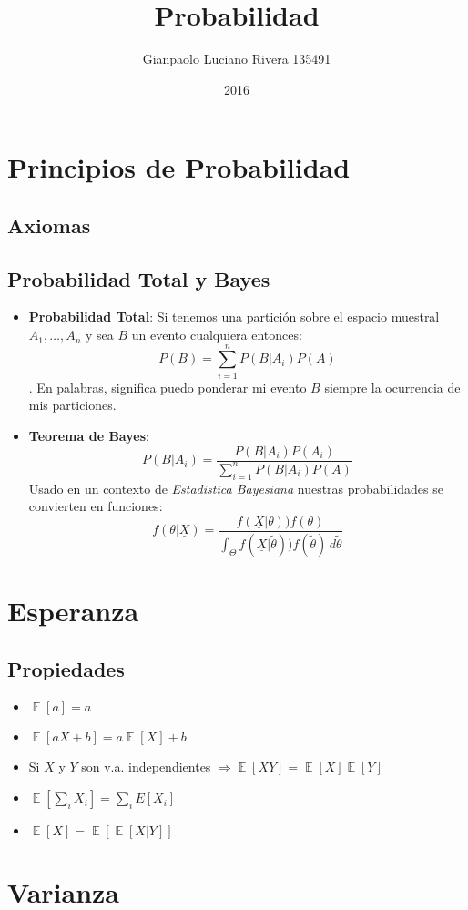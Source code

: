 \documentclass[pdftex,11pt,a4paper]{article}
\title{Probabilidad}
\author{Gianpaolo Luciano Rivera 135491}
\date{2016}
\DeclareMathOperator{\E}{\mathbb{E}}
\begin{document}
\maketitle

\section{Principios de Probabilidad}
\subsection{Axiomas}
\subsection{Probabilidad Total y Bayes}
	\begin{itemize}
		\item \textbf{Probabilidad Total}: Si tenemos una partición sobre el espacio muestral $A_1,\ldots ,A_n$ y sea $B$ un evento cualquiera entonces:$$P(B) = \sum_{i=1}^nP(B|A_i)P(A)$$. En palabras, significa puedo ponderar mi evento $B$ siempre la ocurrencia de mis particiones.
		\item \textbf{Teorema de Bayes}: $$P(B|A_i) = \dfrac{P(B|A_i)P(A_i)}{\sum_{i=1}^nP(B|A_i)P(A)}$$
		Usado en un contexto de \emph{Estadistica Bayesiana} nuestras probabilidades se convierten en funciones: $$f(\theta|\underline{X}) = \dfrac{f(\underline{X}|\theta))f(\theta)}{\int_\Theta f(\underline{X}|\tilde{\theta}))f(\tilde{\theta})\,d\tilde{\theta}}$$
	\end{itemize}
	
\section{Esperanza}
\subsection{Propiedades}
\begin{itemize}
	\item $\E[a] = a$
	\item $\E[aX+b] = a\E[X]+b$
	\item Si $X$ y $Y$ son v.a. independientes $\Rightarrow \E[XY]=\E[X]\E[Y] $ 
	\item $\E[\sum_i X_i] = \sum_i E[X_i] $
	\item $\E[X] = \E[\E[X|Y]]$
\end{itemize}


\section{Varianza}
\end{document}
